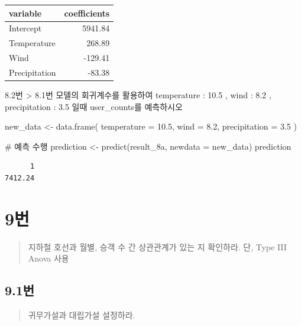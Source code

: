 \documentclass[
  letterpaper,
  DIV=11,
  numbers=noendperiod]{scrreprt}
\newenvironment{Shaded}{\begin{snugshade}}{\end{snugshade}}
\newcommand{\AttributeTok}[1]{\textcolor[rgb]{0.40,0.45,0.13}{#1}}
\newcommand{\CommentTok}[1]{\textcolor[rgb]{0.37,0.37,0.37}{#1}}
\newcommand{\FloatTok}[1]{\textcolor[rgb]{0.68,0.00,0.00}{#1}}
\newcommand{\FunctionTok}[1]{\textcolor[rgb]{0.28,0.35,0.67}{#1}}
\newcommand{\NormalTok}[1]{\textcolor[rgb]{0.00,0.23,0.31}{#1}}
\newcommand{\OtherTok}[1]{\textcolor[rgb]{0.00,0.23,0.31}{#1}}
\begin{document}
\begin{longtable}{lr}
\toprule
variable & coefficients \\ 
\midrule
Intercept & 5941.84 \\ 
Temperature & 268.89 \\ 
Wind & -129.41 \\ 
Precipitation & -83.38 \\ 
\bottomrule
\end{longtable}

8.2번 \textgreater{} 8.1번 모델의 회귀계수를 활용하여 temperature : 10.5
, wind : 8.2 , precipitation : 3.5 일때 user\_counts를 예측하시오

\begin{Shaded}
\begin{Highlighting}[]
\NormalTok{new\_data }\OtherTok{\textless{}{-}} \FunctionTok{data.frame}\NormalTok{(}
  \AttributeTok{temperature =} \FloatTok{10.5}\NormalTok{,}
  \AttributeTok{wind =} \FloatTok{8.2}\NormalTok{,}
  \AttributeTok{precipitation =} \FloatTok{3.5}
\NormalTok{)}

\CommentTok{\# 예측 수행}
\NormalTok{prediction }\OtherTok{\textless{}{-}} \FunctionTok{predict}\NormalTok{(result\_8a, }\AttributeTok{newdata =}\NormalTok{ new\_data)}
\NormalTok{prediction}
\end{Highlighting}
\end{Shaded}

\begin{verbatim}
      1 
7412.24 
\end{verbatim}

\hypertarget{uxbc88-15}{%
\chapter*{9번}\label{uxbc88-15}}


\begin{quote}
지하철 호선과 월별, 승객 수 간 상관관계가 있는 지 확인하라. 단, Type III
Anova 사용
\end{quote}

\hypertarget{uxbc88-16}{%
\section*{9.1번}\label{uxbc88-16}}


\begin{quote}
귀무가설과 대립가설 설정하라.
\end{quote}
\end{document}
